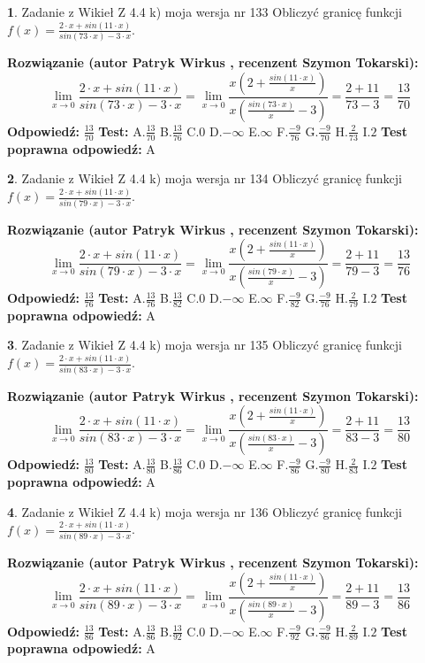\documentclass[12pt, a4paper]{article}
\theoremstyle{definition} %
\newtheorem{zad}{}
\newcommand{\zadStart}[1]{\begin{zad}#1\newline}
\newcommand{\zadStop}{\end{zad}}
\newcommand{\rozwStart}[2]{\noindent \textbf{Rozwiązanie (autor #1 , recenzent #2): }\newline}
\newcommand{\rozwStop}{\newline}
\newcommand{\odpStart}{\noindent \textbf{Odpowiedź:}\newline}
\newcommand{\odpStop}{\newline}
\newcommand{\testStart}{\noindent \textbf{Test:}\newline}
\newcommand{\testStop}{\newline}
\newcommand{\kluczStart}{\noindent \textbf{Test poprawna odpowiedź:}\newline}
\newcommand{\kluczStop}{\newline}
\begin{document}
\zadStart{Zadanie z Wikieł Z 4.4 k) moja wersja nr 133}
Obliczyć granicę funkcji $f(x)=\frac{2\cdot x +sin(11\cdot x)}{sin(73\cdot x) -3\cdot x}$.
\zadStop
\rozwStart{Patryk Wirkus}{Szymon Tokarski}
$$\lim\limits_{x\to 0}\frac{2\cdot x +sin(11\cdot x)}{sin(73\cdot x) -3\cdot x}
=\lim\limits_{x\to 0}\frac{x(2+\frac{sin(11\cdot x)}{x})}{x(\frac{sin(73\cdot x)}{x}-3)}
=\frac{2+11}{73-3} = \frac{13}{70}$$
\rozwStop
\odpStart
$\frac{13}{70}$
\odpStop
\testStart
A.$\frac{13}{70}$
B.$\frac{13}{76}$
C.$0$
D.$-\infty$
E.$\infty$
F.$\frac{-9}{76}$
G.$\frac{-9}{70}$
H.$\frac{2}{73}$
I.$2$
\testStop
\kluczStart
A
\kluczStop



\zadStart{Zadanie z Wikieł Z 4.4 k) moja wersja nr 134}
Obliczyć granicę funkcji $f(x)=\frac{2\cdot x +sin(11\cdot x)}{sin(79\cdot x) -3\cdot x}$.
\zadStop
\rozwStart{Patryk Wirkus}{Szymon Tokarski}
$$\lim\limits_{x\to 0}\frac{2\cdot x +sin(11\cdot x)}{sin(79\cdot x) -3\cdot x}
=\lim\limits_{x\to 0}\frac{x(2+\frac{sin(11\cdot x)}{x})}{x(\frac{sin(79\cdot x)}{x}-3)}
=\frac{2+11}{79-3} = \frac{13}{76}$$
\rozwStop
\odpStart
$\frac{13}{76}$
\odpStop
\testStart
A.$\frac{13}{76}$
B.$\frac{13}{82}$
C.$0$
D.$-\infty$
E.$\infty$
F.$\frac{-9}{82}$
G.$\frac{-9}{76}$
H.$\frac{2}{79}$
I.$2$
\testStop
\kluczStart
A
\kluczStop



\zadStart{Zadanie z Wikieł Z 4.4 k) moja wersja nr 135}
Obliczyć granicę funkcji $f(x)=\frac{2\cdot x +sin(11\cdot x)}{sin(83\cdot x) -3\cdot x}$.
\zadStop
\rozwStart{Patryk Wirkus}{Szymon Tokarski}
$$\lim\limits_{x\to 0}\frac{2\cdot x +sin(11\cdot x)}{sin(83\cdot x) -3\cdot x}
=\lim\limits_{x\to 0}\frac{x(2+\frac{sin(11\cdot x)}{x})}{x(\frac{sin(83\cdot x)}{x}-3)}
=\frac{2+11}{83-3} = \frac{13}{80}$$
\rozwStop
\odpStart
$\frac{13}{80}$
\odpStop
\testStart
A.$\frac{13}{80}$
B.$\frac{13}{86}$
C.$0$
D.$-\infty$
E.$\infty$
F.$\frac{-9}{86}$
G.$\frac{-9}{80}$
H.$\frac{2}{83}$
I.$2$
\testStop
\kluczStart
A
\kluczStop



\zadStart{Zadanie z Wikieł Z 4.4 k) moja wersja nr 136}
Obliczyć granicę funkcji $f(x)=\frac{2\cdot x +sin(11\cdot x)}{sin(89\cdot x) -3\cdot x}$.
\zadStop
\rozwStart{Patryk Wirkus}{Szymon Tokarski}
$$\lim\limits_{x\to 0}\frac{2\cdot x +sin(11\cdot x)}{sin(89\cdot x) -3\cdot x}
=\lim\limits_{x\to 0}\frac{x(2+\frac{sin(11\cdot x)}{x})}{x(\frac{sin(89\cdot x)}{x}-3)}
=\frac{2+11}{89-3} = \frac{13}{86}$$
\rozwStop
\odpStart
$\frac{13}{86}$
\odpStop
\testStart
A.$\frac{13}{86}$
B.$\frac{13}{92}$
C.$0$
D.$-\infty$
E.$\infty$
F.$\frac{-9}{92}$
G.$\frac{-9}{86}$
H.$\frac{2}{89}$
I.$2$
\testStop
\kluczStart
A
\kluczStop
\end{document}
